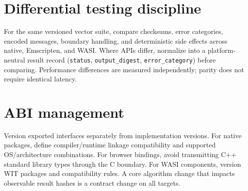 \documentclass[11pt,letterpaper]{article}
\begin{document}
\section{Differential testing discipline}
For the same versioned vector suite, compare checksums, error categories, encoded messages, boundary handling, and deterministic side effects across native, Emscripten, and WASI. Where APIs differ, normalize into a platform-neutral result record (\texttt{status}, \texttt{output\_digest}, \texttt{error\_category}) before comparing. Performance differences are measured independently; parity does not require identical latency.

\section{ABI management}
Version exported interfaces separately from implementation versions. For native packages, define compiler/runtime linkage compatibility and supported OS/architecture combinations. For browser bindings, avoid transmitting C++ standard library types through the C boundary. For WASI components, version WIT packages and compatibility rules. A core algorithm change that impacts observable result hashes is a contract change on all targets.
\end{document}
